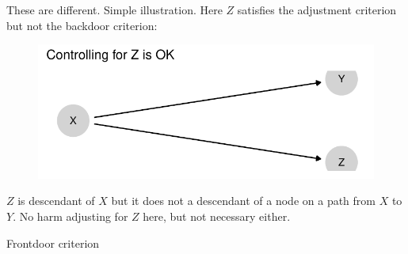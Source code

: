 \documentclass[
  11pt,
  ignorenonframetext,
]{beamer}
\begin{document}
\begin{frame}{These are different. Simple illustration.}
\protect\hypertarget{these-are-different.-simple-illustration.}{}
Here \(Z\) satisfies the adjustment criterion but not the backdoor
criterion:

\begin{figure}

{\centering \includegraphics{2.2_estimands_files/figure-beamer/unnamed-chunk-6-1.pdf}

}

\end{figure}

\(Z\) is descendant of \(X\) but it does not a descendant of a node on a
path from \(X\) to \(Y\). No harm adjusting for \(Z\) here, but not
necessary either.
\end{frame}

\begin{frame}{Frontdoor criterion}
\protect\hypertarget{frontdoor-criterion}{}
\end{frame}
\end{document}
